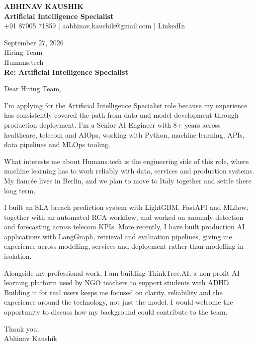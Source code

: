 \documentclass[10pt,a4paper]{article}
\begin{document}
\begin{center}
{\Large\bfseries ABHINAV KAUSHIK}\\[2pt]
{\bfseries Artificial Intelligence Specialist}\\[2pt]
+91 87005 71859 \quad | \quad aabhinav.kaushik@gmail.com \quad | \quad LinkedIn
\end{center}
\vspace{8pt}
September 27, 2026\\[6pt]
Hiring Team\\
Humans.tech\\[4pt]
\textbf{Re: Artificial Intelligence Specialist}

Dear Hiring Team,

I’m applying for the Artificial Intelligence Specialist role because my experience has consistently covered the path from data and model development through production deployment. I’m a Senior AI Engineer with 8+ years across healthcare, telecom and AIOps, working with Python, machine learning, APIs, data pipelines and MLOps tooling.

What interests me about Humans.tech is the engineering side of this role, where machine learning has to work reliably with data, services and production systems. My fiancée lives in Berlin, and we plan to move to Italy together and settle there long term.

I built an SLA breach prediction system with LightGBM, FastAPI and MLflow, together with an automated RCA workflow, and worked on anomaly detection and forecasting across telecom KPIs. More recently, I have built production AI applications with LangGraph, retrieval and evaluation pipelines, giving me experience across modelling, services and deployment rather than modelling in isolation.

Alongside my professional work, I am building ThinkTree.AI, a non-profit AI learning platform used by NGO teachers to support students with ADHD. Building it for real users keeps me focused on clarity, reliability and the experience around the technology, not just the model. I would welcome the opportunity to discuss how my background could contribute to the team.

Thank you,\\
Abhinav Kaushik
\end{document}
